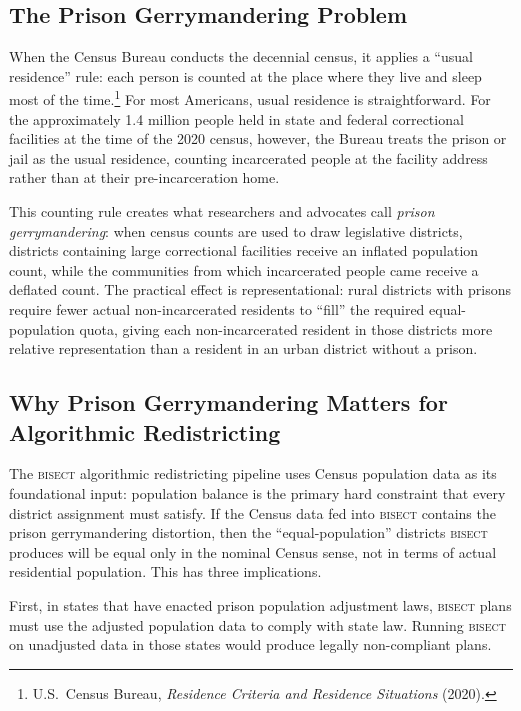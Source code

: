 \label{sec:introduction}

\subsection{The Prison Gerrymandering Problem}

When the Census Bureau conducts the decennial census, it applies a
``usual residence'' rule: each person is counted at the place where they
live and sleep most of the time.\footnote{U.S.\ Census Bureau,
\textit{Residence Criteria and Residence Situations} (2020).}
For most Americans, usual residence is straightforward. For the
approximately 1.4 million people held in state and federal correctional
facilities at the time of the 2020 census, however, the Bureau treats
the prison or jail as the usual residence, counting incarcerated people
at the facility address rather than at their pre-incarceration home.

This counting rule creates what researchers and advocates call
\textit{prison gerrymandering}: when census counts are used to draw
legislative districts, districts containing large correctional facilities
receive an inflated population count, while the communities from which
incarcerated people came receive a deflated count. The practical effect
is representational: rural districts with prisons require fewer actual
non-incarcerated residents to ``fill'' the required equal-population
quota, giving each non-incarcerated resident in those districts more
relative representation than a resident in an urban district without a
prison.

\subsection{Why Prison Gerrymandering Matters for Algorithmic Redistricting}

The \textsc{bisect} algorithmic redistricting pipeline uses Census
population data as its foundational input: population balance is the
primary hard constraint that every district assignment must satisfy.
If the Census data fed into \textsc{bisect} contains the prison
gerrymandering distortion, then the ``equal-population'' districts
\textsc{bisect} produces will be equal only in the nominal Census sense,
not in terms of actual residential population. This has three implications.

First, in states that have enacted prison population adjustment laws,
\textsc{bisect} plans must use the adjusted population data to comply with
state law. Running \textsc{bisect} on unadjusted data in those states
would produce legally non-compliant plans.

